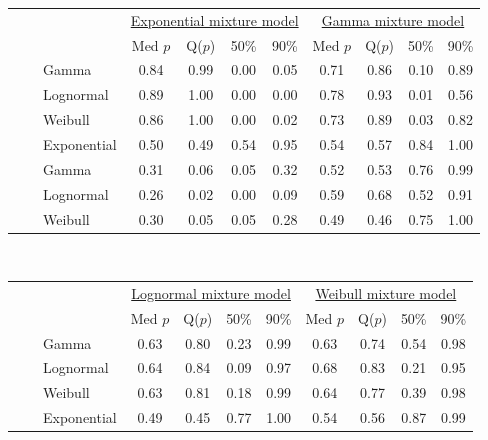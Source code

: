 \documentclass[useAMS,usenatbib,referee,12pt]{article}
\begin{document}
\begin{table}[ht]\centering\footnotesize
\centering
\begin{tabular}{l|l|l|cccc|cccc}
 \multicolumn{3}{c}{ } & \multicolumn{4}{c}{\underline{Exponential mixture model}} & \multicolumn{4}{c}{\underline{Gamma mixture model}} \\
 \multicolumn{3}{c}{ } & Med $p$ & Q($p$) & 50\% & 90\%  & Med $p$ & Q($p$) & 50\% & 90\% \\ 
  \hline
\parbox[t]{2mm}{} & \parbox[t]{2mm}{} & Gamma & 0.84 & 0.99 & 0.00 & 0.05 & 0.71 & 0.86 & 0.10 & 0.89 \\ 
   &  & Lognormal & 0.89 & 1.00 & 0.00 & 0.00 & 0.78 & 0.93 & 0.01 & 0.56 \\ 
   &  & Weibull & 0.86 & 1.00 & 0.00 & 0.02 & 0.73 & 0.89 & 0.03 & 0.82 \\ 
   &  & Exponential & 0.50 & 0.49 & 0.54 & 0.95 & 0.54 & 0.57 & 0.84 & 1.00 \\ 
& \parbox[t]{2mm}{} & Gamma & 0.31 & 0.06 & 0.05 & 0.32 & 0.52 & 0.53 & 0.76 & 0.99 \\ 
   &  & Lognormal & 0.26 & 0.02 & 0.00 & 0.09 & 0.59 & 0.68 & 0.52 & 0.91 \\ 
   &  & Weibull & 0.30 & 0.05 & 0.05 & 0.28 & 0.49 & 0.46 & 0.75 & 1.00 \\ 
   \hline
\end{tabular}
\vspace{0.5cm}\\
\begin{tabular}{l|l|l|cccc|cccc}
 \multicolumn{3}{c}{ } & \multicolumn{4}{c}{\underline{Lognormal mixture model}} & \multicolumn{4}{c}{\underline{Weibull mixture model}} \\
 \multicolumn{3}{c}{ } & Med $p$ & Q($p$) & 50\% & 90\% & Med $p$ & Q($p$) & 50\% & 90\% \\ 
  \hline
\parbox[t]{2mm}{} & \parbox[t]{2mm}{} & Gamma & 0.63 & 0.80 & 0.23 & 0.99 & 0.63 & 0.74 & 0.54 & 0.98 \\ 
   &  & Lognormal & 0.64 & 0.84 & 0.09 & 0.97 & 0.68 & 0.83 & 0.21 & 0.95 \\ 
   &  & Weibull & 0.63 & 0.81 & 0.18 & 0.99 & 0.64 & 0.77 & 0.39 & 0.98 \\ 
   &  & Exponential & 0.49 & 0.45 & 0.77 & 1.00 & 0.54 & 0.56 & 0.87 & 0.99 \\ 

\end{tabular}
\end{table}
\end{document}
